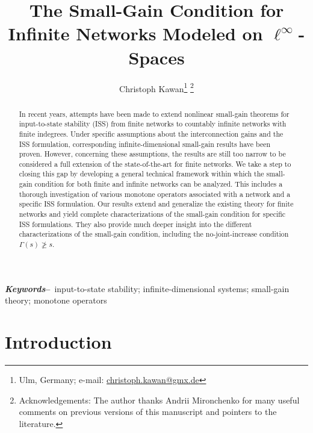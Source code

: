 \documentclass[10pt, oneside, a4paper]{article}
\def\keywords{\vspace{.5em}
{\bf{\textit{{\small Keywords}}--}\,\relax%
}}
\begin{document}
\title{The Small-Gain Condition for Infinite Networks Modeled on $\ell^{\infty}$-Spaces}
\author{Christoph Kawan\footnote{Ulm, Germany; e-mail: \href{mailto:christoph@kawan@gmx.de}{christoph.kawan@gmx.de}}\,\,\footnote{Acknowledgements: The author thanks Andrii Mironchenko for many useful comments on previous versions of this manuscript and pointers to the literature.}}

\date{}
\maketitle

\begin{abstract}
In recent years, attempts have been made to extend nonlinear small-gain theorems for input-to-state stability (ISS) from finite networks to countably infinite networks with finite indegrees. Under specific assumptions about the interconnection gains and the ISS formulation, corresponding infinite-dimensional small-gain results have been proven. However, concerning these assumptions, the results are still too narrow to be considered a full extension of the state-of-the-art for finite networks. We take a step to closing this gap by developing a general technical framework within which the small-gain condition for both finite and infinite networks can be analyzed. This includes a thorough investigation of various monotone operators associated with a network and a specific ISS formulation. Our results extend and generalize the existing theory for finite networks and yield complete characterizations of the small-gain condition for specific ISS formulations. They also provide much deeper insight into the different characterizations of the small-gain condition, including the no-joint-increase condition $\Gamma(s) \not\geq s$.
\end{abstract}

\keywords{\small{input-to-state stability; infinite-dimensional systems; small-gain theory; monotone operators}}

\section{Introduction}
\end{document}
